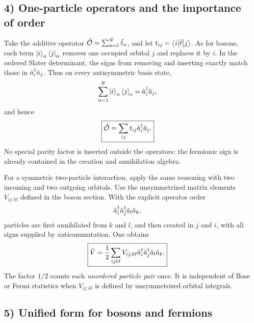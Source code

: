 \subsection*{4) One-particle operators and the importance of order}

Take the additive operator $\hat{\mathcal O}=\sum_{\alpha=1}^N\hat{t}_\alpha$, and let $t_{ij}=\left\langle i\middle|\hat{t}\middle|j\right\rangle$. As for bosons, each term $\left|i\right\rangle_\alpha\left\langle j\right|_\alpha$ removes one occupied orbital $j$ and replaces it by $i$. In the ordered Slater determinant, the signs from removing and inserting exactly match those in $\hat{a}_i^\dagger\hat{a}_j$. Thus on every antisymmetric basis state,
\begin{equation}
\sum_{\alpha=1}^N\left|i\right\rangle_\alpha\left\langle j\right|_\alpha
=\hat{a}_i^\dagger\hat{a}_j,
\end{equation}
and hence
\begin{equation}
\boxed{\hat{\mathcal O}=\sum_{ij}t_{ij}\hat{a}_i^\dagger\hat{a}_j.}
\end{equation}
No special parity factor is inserted outside the operators: the fermionic sign is already contained in the creation and annihilation algebra.

For a symmetric two-particle interaction, apply the same reasoning with two incoming and two outgoing orbitals. Use the unsymmetrized matrix elements $V_{ij;kl}$ defined in the boson section. With the explicit operator order
\begin{equation}
\hat{a}_i^\dagger\hat{a}_j^\dagger\hat{a}_l\hat{a}_k,
\end{equation}
particles are first annihilated from $k$ and $l$, and then created in $j$ and $i$, with all signs supplied by anticommutation. One obtains
\begin{equation}
\boxed{\hat{V}=\frac12\sum_{ijkl}V_{ij;kl}
\hat{a}_i^\dagger\hat{a}_j^\dagger\hat{a}_l\hat{a}_k.}
\end{equation}
The factor $1/2$ counts each \emph{unordered particle pair} once. It is independent of Bose or Fermi statistics when $V_{ij;kl}$ is defined by unsymmetrized orbital integrals.

\subsection*{5) Unified form for bosons and fermions}

